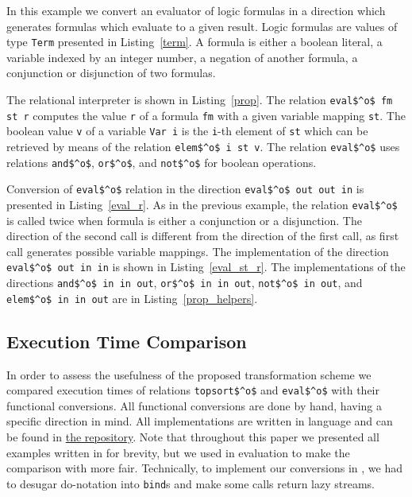 In this example we convert an evaluator of logic formulas in a direction which generates formulas which evaluate to a given result.
Logic formulas are values of type \lstinline{Term} presented in Listing~\ref{term}.
A formula is either a boolean literal, a variable indexed by an integer number, a negation of another formula, a conjunction or disjunction of two formulas.

The relational interpreter is shown in Listing~\ref{prop}.
The relation \lstinline{eval$^o$ fm st r} computes the value \lstinline{r} of a formula \lstinline{fm} with a given variable mapping \lstinline{st}.
The boolean value \lstinline{v} of a variable \lstinline{Var i} is the \lstinline{i}-th element of \lstinline{st} which can be retrieved by means of the relation \lstinline{elem$^o$ i st v}.
The relation \lstinline{eval$^o$} uses relations \lstinline{and$^o$}, \lstinline{or$^o$}, and \lstinline{not$^o$} for boolean operations.

Conversion of \lstinline{eval$^o$} relation in the direction \lstinline[breaklines=true]{eval$^o$ out out in} is presented in Listing~\ref{eval_r}.
As in the previous example, the relation \lstinline{eval$^o$} is called twice when formula is either a conjunction or a disjunction.
The direction of the second call is different from the direction of the first call, as first call generates possible variable mappings.
The implementation of the direction \lstinline{eval$^o$ out in in} is shown in Listing~\ref{eval_st_r}.
The implementations of the directions \lstinline{and$^o$ in in out}, \lstinline{or$^o$ in in out}, \lstinline{not$^o$ in out}, and \lstinline{elem$^o$ in in out} are in Listing~\ref{prop_helpers}.


\subsection{Execution Time Comparison}

In order to assess the usefulness of the proposed transformation scheme we compared execution times of \mk relations \lstinline{topsort$^o$} and \lstinline{eval$^o$} with their functional conversions.
All functional conversions are done by hand, having a specific direction in mind.
All implementations are written in \ocaml language and can be found in \href{https://github.com/kajigor/miniKanren-func/tree/f7a3ab72fe1a945a650a443627be35093d7224a0}{the repository}.
Note that throughout this paper we presented all examples written in \haskell for brevity, but we used \ocaml in evaluation to make the comparison with \ocanren more fair.
Technically, to implement our conversions in \ocaml, we had to desugar \haskell do-notation into \lstinline{bind}s and make some calls return lazy streams.


